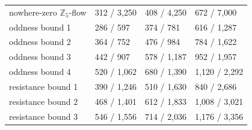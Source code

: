 \begin{tabular}{llll}
nowhere-zero $\mathbb Z_5$-flow & 312 / 3{,}250 & 408 / 4{,}250 & 672 / 7{,}000\\
oddness bound 1 & 286 / 597 & 374 / 781 & 616 / 1{,}287\\
oddness bound 2 & 364 / 752 & 476 / 984 & 784 / 1{,}622\\
oddness bound 3 & 442 / 907 & 578 / 1{,}187 & 952 / 1{,}957\\
oddness bound 4 & 520 / 1{,}062 & 680 / 1{,}390 & 1{,}120 / 2{,}292\\
resistance bound 1 & 390 / 1{,}246 & 510 / 1{,}630 & 840 / 2{,}686\\
resistance bound 2 & 468 / 1{,}401 & 612 / 1{,}833 & 1{,}008 / 3{,}021\\
resistance bound 3 & 546 / 1{,}556 & 714 / 2{,}036 & 1{,}176 / 3{,}356\\
\bottomrule
\end{tabular}
